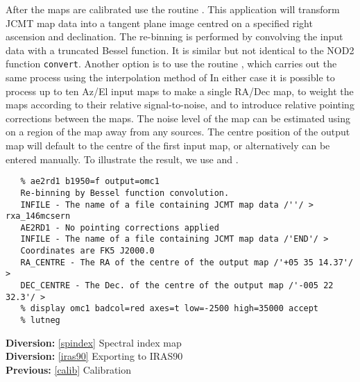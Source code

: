    After the maps are calibrated use the routine
{\tt {}}.
   This application will transform JCMT map data into a tangent plane
   image centred on a specified right ascension and declination. The
   re-binning is performed by convolving the input data with a truncated
   Bessel function. It is similar but not identical to the NOD2 function
   {\tt convert}. Another option is to use the routine
{\tt {}},
   which carries out the same process using the interpolation method of
   In either case it is possible to process up to ten
   Az/El input maps to make a single RA/Dec map, to weight the maps according
   to their relative signal-to-noise, and to introduce relative pointing
   corrections between the maps. The noise level of the map can be
   estimated using
{\tt {}}
   on a region of the map away from any
   sources. The centre position of the output map will default to the
   centre of the first input map, or alternatively can be entered
   manually. To illustrate
   the result, we use
{\tt {}}
   and
{\tt {}}.

\begin{verbatim}
   % ae2rd1 b1950=f output=omc1
   Re-binning by Bessel function convolution.
   INFILE - The name of a file containing JCMT map data /''/ > rxa_146mcsern
   AE2RD1 - No pointing corrections applied
   INFILE - The name of a file containing JCMT map data /'END'/ >
   Coordinates are FK5 J2000.0
   RA_CENTRE - The RA of the centre of the output map /'+05 35 14.37'/ >
   DEC_CENTRE - The Dec. of the centre of the output map /'-005 22 32.3'/ >
   % display omc1 badcol=red axes=t low=-2500 high=35000 accept
   % lutneg
\end{verbatim}

\begin{latexonly}
\begin{center}
\leavevmode\epsfysize=80mm
\end{center}
\end{latexonly}

\begin{latexonly}
{\bf Diversion:} \ref{spindex} Spectral index map\\
{\bf Diversion:} \ref{iras90} Exporting to IRAS90\\
{\bf Previous:} \ref{calib} Calibration\\
\end{latexonly}

